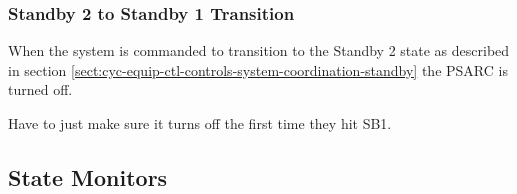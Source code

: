 \documentclass[11pt]{book}		%
\begin{document}
\color{black}

\subsubsection{Standby 2 to Standby 1 Transition}

When the system is commanded to transition to the Standby 2 state as described in section \ref{sect:cyc-equip-ctl-controls-system-coordination-standby} the PSARC is turned off.

\color{red}

Have to just make sure it turns off the first time they hit SB1.

\color{black}

\subsection{State Monitors}
\end{document}
